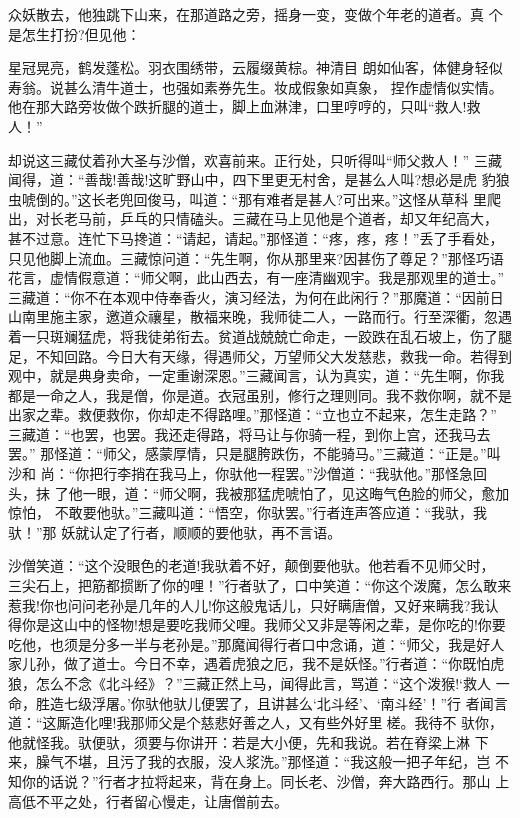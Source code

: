 众妖散去，他独跳下山来，在那道路之旁，摇身一变，变做个年老的道者。真
个是怎生打扮?但见他：

星冠晃亮，鹤发蓬松。羽衣围绣带，云履缀黄棕。神清目
朗如仙客，体健身轻似寿翁。说甚么清牛道士，也强如素券先生。妆成假象如真象，
捏作虚情似实情。
他在那大路旁妆做个跌折腿的道士，脚上血淋津，口里哼哼的，只叫“救人!救人！”

却说这三藏仗着孙大圣与沙僧，欢喜前来。正行处，只听得叫“师父救人！”
三藏闻得，道：“善哉!善哉!这旷野山中，四下里更无村舍，是甚么人叫?想必是虎
豹狼虫唬倒的。”这长老兜回俊马，叫道：“那有难者是甚人?可出来。”这怪从草科
里爬出，对长老马前，乒乓的只情磕头。三藏在马上见他是个道者，却又年纪高大，
甚不过意。连忙下马搀道：“请起，请起。”那怪道：“疼，疼，疼！”丢了手看处，
只见他脚上流血。三藏惊问道：“先生啊，你从那里来?因甚伤了尊足？”那怪巧语
花言，虚情假意道：“师父啊，此山西去，有一座清幽观宇。我是那观里的道士。”
三藏道：“你不在本观中侍奉香火，演习经法，为何在此闲行？”那魔道：“因前日
山南里施主家，邀道众禳星，散福来晚，我师徒二人，一路而行。行至深衢，忽遇
着一只斑斓猛虎，将我徒弟衔去。贫道战兢兢亡命走，一跤跌在乱石坡上，伤了腿
足，不知回路。今日大有天缘，得遇师父，万望师父大发慈悲，救我一命。若得到
观中，就是典身卖命，一定重谢深恩。”三藏闻言，认为真实，道：“先生啊，你我
都是一命之人，我是僧，你是道。衣冠虽别，修行之理则同。我不救你啊，就不是
出家之辈。救便救你，你却走不得路哩。”那怪道：“立也立不起来，怎生走路？”
三藏道：“也罢，也罢。我还走得路，将马让与你骑一程，到你上宫，还我马去罢。”
那怪道：“师父，感蒙厚情，只是腿胯跌伤，不能骑马。”三藏道：“正是。”叫沙和
尚：“你把行李捎在我马上，你驮他一程罢。”沙僧道：“我驮他。”那怪急回头，抹
了他一眼，道：“师父啊，我被那猛虎唬怕了，见这晦气色脸的师父，愈加惊怕，
不敢要他驮。”三藏叫道：“悟空，你驮罢。”行者连声答应道：“我驮，我驮！”那
妖就认定了行者，顺顺的要他驮，再不言语。

沙僧笑道：“这个没眼色的老道!我驮着不好，颠倒要他驮。他若看不见师父时，
三尖石上，把筋都掼断了你的哩！”行者驮了，口中笑道：“你这个泼魔，怎么敢来
惹我!你也问问老孙是几年的人儿!你这般鬼话儿，只好瞒唐僧，又好来瞒我?我认
得你是这山中的怪物!想是要吃我师父哩。我师父又非是等闲之辈，是你吃的!你要
吃他，也须是分多一半与老孙是。”那魔闻得行者口中念诵，道：“师父，我是好人
家儿孙，做了道士。今日不幸，遇着虎狼之厄，我不是妖怪。”行者道：“你既怕虎
狼，怎么不念《北斗经》？”三藏正然上马，闻得此言，骂道：“这个泼猴!‘救人
一命，胜造七级浮屠。’你驮他驮儿便罢了，且讲甚么‘北斗经’、‘南斗经’！”行
者闻言道：“这厮造化哩!我那师父是个慈悲好善之人，又有些外好里槎。我待不
驮你，他就怪我。驮便驮，须要与你讲开：若是大小便，先和我说。若在脊梁上淋
下来，臊气不堪，且污了我的衣服，没人浆洗。”那怪道：“我这般一把子年纪，岂
不知你的话说？”行者才拉将起来，背在身上。同长老、沙僧，奔大路西行。那山
上高低不平之处，行者留心慢走，让唐僧前去。

